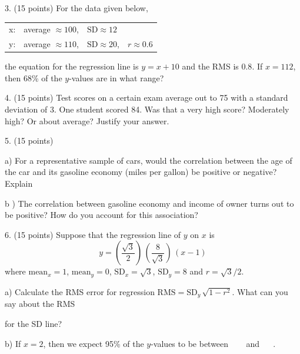\documentclass[10pt]{article}
\begin{document}
3. (15 points)
For the data given below, \vspace{-8pt}
\begin{center}
\begin{tabular}{llll}
x: & average $\approx 100$, & $\mbox{SD}\approx 12$\\
y: & average $\approx 110$, & $\mbox{SD}\approx 20$,  & $r\approx 0.6$\\
\end{tabular}\vspace{-8pt}
\end{center}
the equation for the regression line is $y=x+10$ and the RMS is $0.8$.
If $x=112$, then 68\% of the $y$-values are in what range?
\vspace{1.8in}


4. (15 points) Test scores on a certain exam average out to 75 with a standard 
deviation of 3.  One student scored 84.   Was that a very high score?  Moderately high?  
Or about average?  Justify your answer.
\vfill
\eject
{\ }


5. (15 points) 

\hspace{20pt} a) For a representative sample of cars, would the correlation between the
age of the car and its gasoline economy (miles per gallon) be positive or negative?  Explain
\vspace{1.5in}

\hspace{20pt} b ) The correlation between gasoline economy and income of owner turns out to 
be positive?  How do you account for this association?
\vspace{1.5in}


6. (15 points) Suppose that the regression line of $y$ on $x$ 
is \[y=\left(\frac{\sqrt{3}}{2}\right)\,\left(\frac{8}{\sqrt{3}}\right)\,(x-1)\] 
where $\mbox{mean}_x=1$, $\mbox{mean}_y=0$, $\mbox{SD}_x=\sqrt{3}$, $\mbox{SD}_y=8$
and $r=\sqrt{3}/2$.\vspace{3pt}

\hspace{20pt} a) Calculate the RMS error for regression 
$\mbox{RMS}=\mbox{SD}_y\,\sqrt{1-r^2}$.  What can you say about the RMS\vspace{-4pt}

\hspace{20pt}\hphantom{b) } for the SD line?
\vspace{1.6in}

\hspace{20pt} b) If $x=2$, then we expect 95\% of the $y$-values to be
between \ \underline{\hspace{60pt}} \ \ and \  \underline{\hspace{60pt}} \ .
\end{document}
